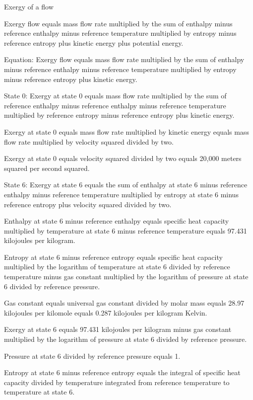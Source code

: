 Exergy of a flow  

Exergy flow equals mass flow rate multiplied by the sum of enthalpy minus reference enthalpy minus reference temperature multiplied by entropy minus reference entropy plus kinetic energy plus potential energy.  

Equation:  
Exergy flow equals mass flow rate multiplied by the sum of enthalpy minus reference enthalpy minus reference temperature multiplied by entropy minus reference entropy plus kinetic energy.  

State 0:  
Exergy at state 0 equals mass flow rate multiplied by the sum of reference enthalpy minus reference enthalpy minus reference temperature multiplied by reference entropy minus reference entropy plus kinetic energy.  

Exergy at state 0 equals mass flow rate multiplied by kinetic energy equals mass flow rate multiplied by velocity squared divided by two.  

Exergy at state 0 equals velocity squared divided by two equals 20,000 meters squared per second squared.  

State 6:  
Exergy at state 6 equals the sum of enthalpy at state 6 minus reference enthalpy minus reference temperature multiplied by entropy at state 6 minus reference entropy plus velocity squared divided by two.  

Enthalpy at state 6 minus reference enthalpy equals specific heat capacity multiplied by temperature at state 6 minus reference temperature equals 97.431 kilojoules per kilogram.  

Entropy at state 6 minus reference entropy equals specific heat capacity multiplied by the logarithm of temperature at state 6 divided by reference temperature minus gas constant multiplied by the logarithm of pressure at state 6 divided by reference pressure.  

Gas constant equals universal gas constant divided by molar mass equals 28.97 kilojoules per kilomole equals 0.287 kilojoules per kilogram Kelvin.  

Exergy at state 6 equals 97.431 kilojoules per kilogram minus gas constant multiplied by the logarithm of pressure at state 6 divided by reference pressure.  

Pressure at state 6 divided by reference pressure equals 1.  

Entropy at state 6 minus reference entropy equals the integral of specific heat capacity divided by temperature integrated from reference temperature to temperature at state 6.  

